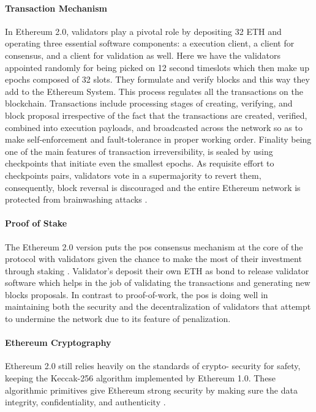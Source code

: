 \paragraph{Transaction Mechanism}

In Ethereum 2.0, validators play a pivotal role by depositing 32 ETH and operating three essential software components: a execution client, a client for consensus, and a client for 
validation as well. Here we have the validators appointed randomly for being picked on 12 second timeslots which then make up epochs composed of 32 slots. They formulate 
and verify blocks and this way they add to the Ethereum System. This process regulates all the transactions on the blockchain. Transactions include processing stages of 
creating, verifying, and block proposal irrespective of the fact that the transactions are created, verified, combined into execution payloads, and broadcasted across 
the network so as to make self-enforcement and fault-tolerance in proper working order. Finality being one of the main features of transaction irreversibility, is 
sealed by using checkpoints that initiate even the smallest epochs. As requisite effort to checkpoints pairs, validators vote in a supermajority to revert them, 
consequently, block reversal is discouraged and the entire Ethereum network is protected from brainwashing attacks \cite{ethereumpos}.

\paragraph{Proof of Stake}

The Ethereum 2.0 version puts the \gls{pos} consensus mechanism at the core of the protocol with validators given the chance to make the most of their 
investment through staking \cite{ethereumpos}. Validator's deposit their own ETH as bond to release validator software which helps in the job of validating the transactions and 
generating new blocks proposals. In contrast to proof-of-work, the \gls{pos} is doing well in maintaining both the security and the decentralization of validators that 
attempt to undermine the network due to its feature of penalization.

\paragraph{Ethereum Cryptography}

Ethereum 2.0 still relies heavily on the standards of crypto- security for safety, keeping the Keccak-256 algorithm implemented by Ethereum 1.0. These 
algorithmic primitives give Ethereum strong security by making sure the data integrity, confidentiality, and authenticity \cite{9129332}.

